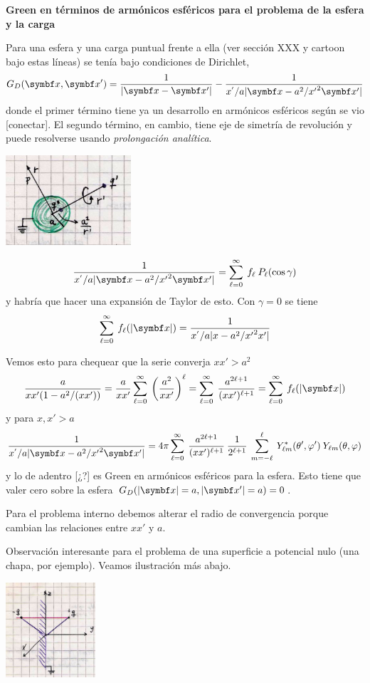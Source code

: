 \documentclass[10pt,oneside]{CBFT_book}
\begin{document}
\begin{ejemplo}{\bf Green en términos de armónicos esféricos para el problema de la esfera y
la carga}

Para una esfera y una carga puntual frente a ella (ver sección XXX y cartoon bajo estas líneas)
se tenía bajo condiciones de Dirichlet,
\[
	G_D(\vbx,\vbx') = \frac{1}{|\vbx - \vbx'|} - \frac{1}{x^{'}/a|\vbx - a^2/{x'}^2\vbx'|}
\]
donde el primer término tiene ya un desarrollo en armónicos esféricos según se vio [conectar].
El segundo término, en cambio, tiene eje de simetría de revolución y puede resolverse
usando {\it prolongación analítica}.

\includegraphics[width=0.35\textwidth]{images/fig_ft1_green_ArmEsf_esferacarga.jpg}

\[
	 \frac{1}{x^{'}/a|\vbx - a^2/{x'}^2\vbx'|} = \sum_{\ell=0}^{\infty} \: f_\ell \: P_\ell(\cos\gamma)
\]
y habría que hacer una expansión de Taylor de esto. Con $\gamma=0$ se tiene
\[
	\sum_{\ell=0}^{\infty} \: f_\ell(|\vbx|) = \frac{1}{x^{'}/a|x - a^2/{x'}^2x'|}
\]

Vemos esto para chequear que la serie converja $ x x'> a^2 $
\[
	\frac{a}{x x' ( 1 - a^2/( xx') )} = 
	\frac{a}{xx'} \sum_{\ell=0}^{\infty} \: \Frac{a^2}{xx'}^\ell =
	\sum_{\ell=0}^{\infty} \: \frac{a^{2\ell+1}}{(xx')^{\ell+1}} = 
	\sum_{\ell=0}^{\infty} \: f_\ell(|\vbx|)
\]
y para $x,x'>a$
\[
	\frac{1}{x^{'}/a|\vbx - a^2/{x'}^2\vbx'|} = 
	4 \pi \sum_{\ell=0}^{\infty} \: \frac{a^{2\ell+1}}{(xx')^{\ell+1}} \:
	\frac{1}{2^{\ell+1}} \: \sum_{m=-\ell}^{\ell} \: Y_{\ell m}^*(\theta',\vp') \:
	Y_{\ell m}(\theta,\vp)
\]
y lo de adentro [¿?] es Green en armónicos esféricos para la esfera. Esto tiene que valer cero
sobre la esfera $ G_D(|\vbx|=a,|\vbx'|=a) = 0$.

Para el problema interno debemos alterar el radio de convergencia porque cambian las relaciones
entre $xx'$ y $a$.

Observación interesante para el problema de una superficie a potencial nulo (una chapa, por ejemplo).
Veamos ilustración más abajo.

\includegraphics[width=0.25\textwidth]{images/fig_ft1_green_ArmEsf_chapaV0_1.jpg} 


\end{ejemplo}
\end{document}
